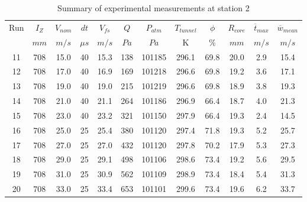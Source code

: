 \begin{table}[H]
\begin{center}
\begin{tabular}{|cccccccccccc|}
	\hline
	Run & $I_Z$ & $V_{nom}$ & $dt$ & $V_{fs}$ & $Q$ & $P_{atm}$ & $T_{tunnel}$ & $\phi$ & $R_{core}$ & $\overline{t}_{max}$ & $\overline{w}_{mean}$\\
	  & $mm$ & $m/s$ & $\mu s$ & $m/s$ & $Pa$ & $Pa$ & K & $\%$ & $mm$ & $m/s$ & $m/s$\\
	\hline
	11 & 708 & 15.0 & 40 & 15.3 & 138 & 101185 & 296.1 & 69.8 & 20.0 & 2.9 & 15.4\\
	12 & 708 & 17.0 & 40 & 16.9 & 169 & 101218 & 296.6 & 69.8 & 19.2 & 3.6 & 17.1\\
	13 & 708 & 19.0 & 40 & 19.0 & 215 & 101219 & 296.6 & 69.8 & 18.9 & 3.8 & 19.3\\
	14 & 708 & 21.0 & 40 & 21.1 & 264 & 101186 & 296.9 & 66.4 & 18.7 & 4.0 & 21.3\\
	15 & 708 & 23.0 & 40 & 23.2 & 321 & 101150 & 297.9 & 66.4 & 19.3 & 2.4 & 14.5\\
	16 & 708 & 25.0 & 25 & 25.4 & 380 & 101120 & 297.4 & 71.8 & 19.3 & 5.2 & 25.7\\
	17 & 708 & 27.0 & 25 & 27.0 & 432 & 101120 & 297.8 & 70.2 & 17.9 & 5.3 & 27.3\\
	18 & 708 & 29.0 & 25 & 29.1 & 498 & 101106 & 298.6 & 73.4 & 19.2 & 5.6 & 29.5\\
	19 & 708 & 31.0 & 25 & 30.9 & 562 & 101109 & 298.9 & 73.4 & 18.4 & 5.4 & 31.3\\
	20 & 708 & 33.0 & 25 & 33.4 & 653 & 101101 & 299.6 & 73.4 & 19.6 & 6.2 & 33.7\\
	\hline
\end{tabular}
\caption{Summary of experimental measurements at station 2}
\label{table:experiment_results_2}
\end{center}
\end{table}
